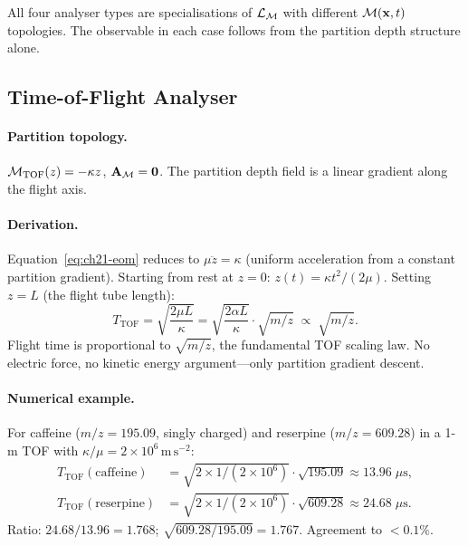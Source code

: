 \begin{theorem}
\label{thm:ch21-universality}
  All four analyser types are specialisations of $\mathcal{L}_{\mathcal{M}}$ with
  different $\mathcal{M}(\mathbf{x},t)$ topologies.  The observable in each case
  follows from the partition depth structure alone.
\end{theorem}

\subsection{Time-of-Flight Analyser}

\paragraph{Partition topology.}
$\mathcal{M}_{\mathrm{TOF}}(z) = -\kappa z$, $\mathbf{A}_{\mathcal{M}} = \mathbf{0}$.  The
partition depth field is a linear gradient along the flight axis.

\paragraph{Derivation.}
Equation~\eqref{eq:ch21-eom} reduces to $\mu\ddot{z} = \kappa$ (uniform
acceleration from a constant partition gradient).  Starting from rest at $z=0$:
$z(t) = \kappa t^2 / (2\mu)$.  Setting $z = L$ (the flight tube length):
\begin{equation}\label{eq:ch21-tof}
  \boxed{T_{\mathrm{TOF}} = \sqrt{\frac{2\mu L}{\kappa}} = \sqrt{\frac{2\alpha L}{\kappa}}\cdot\sqrt{m/z}\;\propto\;\sqrt{m/z}.}
\end{equation}
Flight time is proportional to $\sqrt{m/z}$, the fundamental TOF scaling law.
No electric force, no kinetic energy argument---only partition gradient
descent.

\paragraph{Numerical example.}
For caffeine ($m/z = 195.09$, singly charged) and reserpine ($m/z = 609.28$)
in a 1-m TOF with $\kappa/\mu = 2\times 10^6\,\mathrm{m\,s^{-2}}$:
\begin{align*}
  T_{\mathrm{TOF}}(\text{caffeine})  &= \sqrt{2\times 1/(2\times 10^6)}\cdot\sqrt{195.09}
    \approx 13.96\;\mu\mathrm{s},\\
  T_{\mathrm{TOF}}(\text{reserpine}) &= \sqrt{2\times 1/(2\times 10^6)}\cdot\sqrt{609.28}
    \approx 24.68\;\mu\mathrm{s}.
\end{align*}
Ratio: $24.68/13.96 = 1.768$; $\sqrt{609.28/195.09} = 1.767$.  Agreement to
$<0.1\%$.

